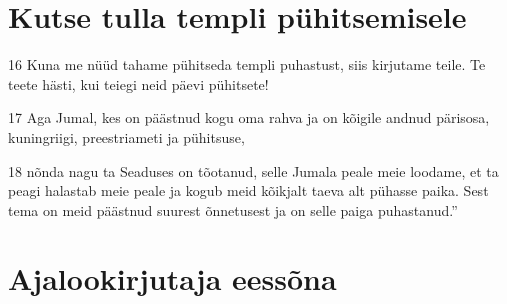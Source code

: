 \section*{Kutse tulla templi pühitsemisele}

\par 16 Kuna me nüüd tahame pühitseda templi puhastust, siis kirjutame teile. Te teete hästi, kui teiegi neid päevi pühitsete!
\par 17 Aga Jumal, kes on päästnud kogu oma rahva ja on kõigile andnud pärisosa, kuningriigi, preestriameti ja pühitsuse,
\par 18 nõnda nagu ta Seaduses on tõotanud, selle Jumala peale meie loodame, et ta peagi halastab meie peale ja kogub meid kõikjalt taeva alt pühasse paika. Sest tema on meid päästnud suurest õnnetusest ja on selle paiga puhastanud.”


\section*{Ajalookirjutaja eessõna}

